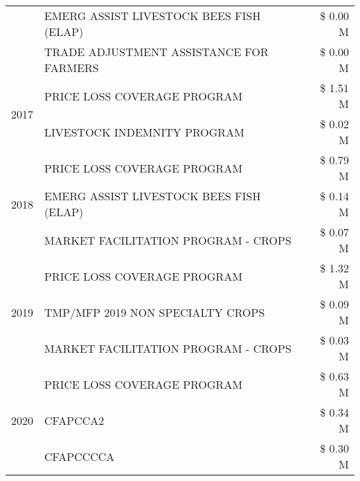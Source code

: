 \begin{tabular}{llr}
 & EMERG ASSIST LIVESTOCK BEES FISH (ELAP) & \$ 0.00 M \\
 & TRADE ADJUSTMENT ASSISTANCE FOR FARMERS & \$ 0.00 M \\
\cline{1-3}
\multirow[t]{2}{*}{2017} & PRICE LOSS COVERAGE PROGRAM & \$ 1.51 M \\
 & LIVESTOCK INDEMNITY PROGRAM & \$ 0.02 M \\
\cline{1-3}
\multirow[t]{3}{*}{2018} & PRICE LOSS COVERAGE PROGRAM & \$ 0.79 M \\
 & EMERG ASSIST LIVESTOCK BEES FISH (ELAP) & \$ 0.14 M \\
 & MARKET FACILITATION PROGRAM - CROPS & \$ 0.07 M \\
\cline{1-3}
\multirow[t]{3}{*}{2019} & PRICE LOSS COVERAGE PROGRAM & \$ 1.32 M \\
 & TMP/MFP 2019 NON SPECIALTY CROPS & \$ 0.09 M \\
 & MARKET FACILITATION PROGRAM - CROPS & \$ 0.03 M \\
\cline{1-3}
\multirow[t]{3}{*}{2020} & PRICE LOSS COVERAGE PROGRAM & \$ 0.63 M \\
 & CFAPCCA2 & \$ 0.34 M \\
 & CFAPCCCCA & \$ 0.30 M \\
\cline{1-3}
\bottomrule
\end{tabular}
